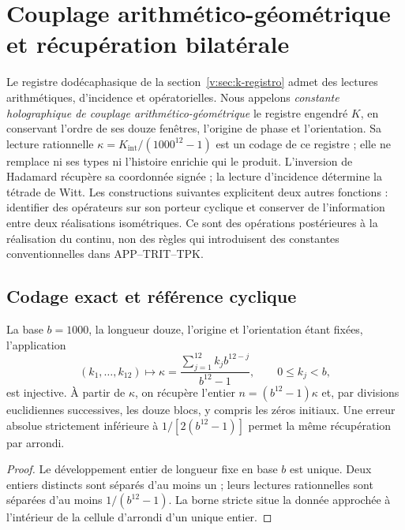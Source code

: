 \section{Couplage arithmético-géométrique et récupération bilatérale}
\label{v:sec:acoplamiento-recuperacion}

Le registre dodécaphasique de la section~\ref{v:sec:k-registro} admet
des lectures arithmétiques, d’incidence et opératorielles. Nous appelons
\emph{constante holographique de couplage arithmético-géométrique}
le registre engendré \(K\), en conservant l’ordre de ses douze fenêtres,
l’origine de phase et l’orientation. Sa lecture rationnelle
\(\kappa=K_{\mathrm{int}}/(1000^{12}-1)\) est un codage de ce
registre ; elle ne remplace ni ses types ni l’histoire enrichie qui le produit.
L’inversion de Hadamard récupère sa coordonnée signée ; la lecture
d’incidence détermine la tétrade de Witt. Les constructions suivantes
explicitent deux autres fonctions : identifier des opérateurs sur son porteur
cyclique et conserver de l’information entre deux réalisations isométriques.
Ce sont des opérations postérieures à la réalisation du continu, non des règles
qui introduisent des constantes conventionnelles dans APP--TRIT--TPK.

\subsection{Codage exact et référence cyclique}
\label{v:subsec:acoplamiento-codigo}

\begin{proposition}
La base \(b=1000\), la longueur douze, l’origine et l’orientation étant fixées, l’application
\[
 (k_1,\ldots,k_{12})\longmapsto
 \kappa=\frac{\sum_{j=1}^{12}k_jb^{12-j}}{b^{12}-1},
 \qquad 0\leq k_j<b,
\]
est injective. À partir de \(\kappa\), on récupère l’entier
\(n=(b^{12}-1)\kappa\) et, par divisions euclidiennes successives, les douze
blocs, y compris les zéros initiaux. Une erreur absolue strictement
inférieure à \(1/[2(b^{12}-1)]\) permet la même récupération par arrondi.
\end{proposition}
\begin{proof}
Le développement entier de longueur fixe en base \(b\) est unique. Deux entiers
distincts sont séparés d’au moins un ; leurs lectures rationnelles
sont séparées d’au moins \(1/(b^{12}-1)\). La borne stricte situe la
donnée approchée à l’intérieur de la cellule d’arrondi d’un unique entier.
\end{proof}

